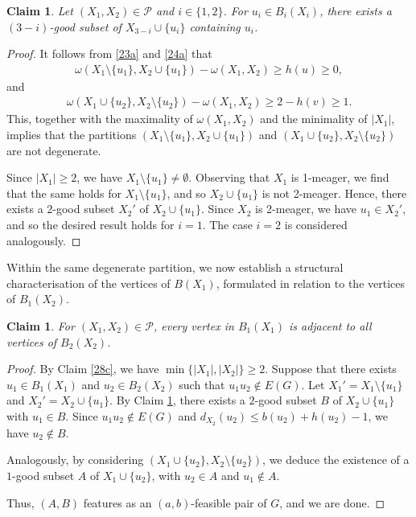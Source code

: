 \documentclass[11p]{elsarticle}
\newtheorem{claim}[theorem]{Claim}
\theoremstyle{definition}
\begin{document}
	\begin{claim}\label{26c}
		Let $ (X_1,X_2)\in\mathcal{P} $ and $ i\in\{1,2\} $. For $ u_i\in B_i(X_i) $, there exists a $ (3-i) $-good subset of $ X_{3-i}\cup\{u_i\} $ containing $ u_i $.
	\end{claim}
\begin{proof}
     It follows from \eqref{23a} and \eqref{24a} that
     \begin{align*}
     	\omega(X_1\setminus\{u_1\},X_2\cup\{u_1\})-\omega(X_1,X_2)\ge h(u) \ge0,
     \end{align*}
 and
 \begin{align*}
 	\omega(X_1\cup\{u_2\},X_2\setminus\{u_2\})-\omega(X_1,X_2)\ge2-h(v)\ge1.
 \end{align*}
This, together with the maximality of $ \omega(X_1,X_2) $ and the minimality of $\left|X_1 \right|$, implies that the partitions $ (X_1\setminus\{u_1\},X_2\cup\{u_1\}) $ and $ (X_1\cup\{u_2\},X_2\setminus\{u_2\}) $ are not degenerate.

 Since $ \left| X_1\right|\ge2 $, we have  $ X_1\setminus\{u_1\}\neq\emptyset $. Observing that  $ X_1 $ is 1-meager, we find that the same holds for $ X_1\setminus\{u_1\} $, and so  $ X_2\cup\{u_1\} $ is not 2-meager. Hence, there exists a  $ 2 $-good subset $ X_2' $ of $ X_2\cup\{u_1\} $. Since $ X_2 $ is 2-meager, we have $ u_1\in X_2' $, and so the desired result holds for $i=1$. The case $ i=2 $ is considered analogously.
\end{proof}

Within the same degenerate partition, we now establish a structural characterisation of the vertices of $B(X_1)$, formulated in relation to the vertices of $B_1(X_2)$.



	 \begin{claim}\label{24c}
	 	For  $ (X_1,X_2)\in\mathcal{P} $, every vertex in $ B_1(X_1) $ is adjacent to all vertices of $ B_2(X_2) $.
	 \end{claim}
	\begin{proof} By Claim \ref{28c}, we have    $\min\{|X_1|,   | X_2|\}\ge 2$. Suppose that there {exists}   $ u_1\in B_1(X_1) $ and $ u_2\in B_2(X_2)$ such that $u_1u_2\not\in E(G)$.  Let $ X_1'=X_1\setminus\{u_1\} $ and $ X_2'=X_2\cup\{u_1\} $. By Claim \ref{26c},  there exists a $ 2 $-good subset $ B $ of $ X_2\cup\{u_{1}\} $ with $ u_{1}\in B $.  Since $ u_1u_2\notin E(G) $ and $ d_{X_2}(u_2)\le b(u_2)+h(u_2)-1 $, we have  $ u_2\notin B $.
 
 Analogously, by considering  $ (X_1\cup\{u_2\},X_2\setminus\{u_2\}) $, we deduce the existence of a $ 1 $-good subset $ A $ of $ X_1\cup\{u_2\} $, with $ u_{2}\in A $ and $u_1\not\in A$.

Thus, $ (A,B) $ features as an $ (a,b) $-feasible pair of $ G $, and we are done.
	\end{proof}
\end{document}
